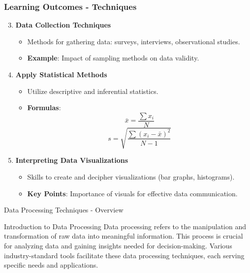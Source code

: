 \documentclass[aspectratio=169]{beamer}
\begin{document}
\begin{frame}[fragile]
    \frametitle{Learning Outcomes - Techniques}
    \begin{enumerate}
        \setcounter{enumi}{2}
        \item \textbf{Data Collection Techniques}
            \begin{itemize}
                \item Methods for gathering data: surveys, interviews, observational studies.
                \item \textbf{Example}: Impact of sampling methods on data validity.
            \end{itemize}
        
        \item \textbf{Apply Statistical Methods}
            \begin{itemize}
                \item Utilize descriptive and inferential statistics.
                \item \textbf{Formulas}:
                    \begin{equation}
                        \bar{x} = \frac{\sum x_i}{N}
                    \end{equation}
                    \begin{equation}
                        s = \sqrt{\frac{\sum (x_i - \bar{x})^2}{N-1}}
                    \end{equation}
            \end{itemize}
        
        \item \textbf{Interpreting Data Visualizations}
            \begin{itemize}
                \item Skills to create and decipher visualizations (bar graphs, histograms).
                \item \textbf{Key Points}: Importance of visuals for effective data communication.
            \end{itemize}
    \end{enumerate}
\end{frame}

\begin{frame}[fragile]{Data Processing Techniques - Overview}
    \begin{block}{Introduction to Data Processing}
        Data processing refers to the manipulation and transformation of raw data into meaningful information. This process is crucial for analyzing data and gaining insights needed for decision-making. Various industry-standard tools facilitate these data processing techniques, each serving specific needs and applications.
    \end{block}
\end{frame}
\end{document}
